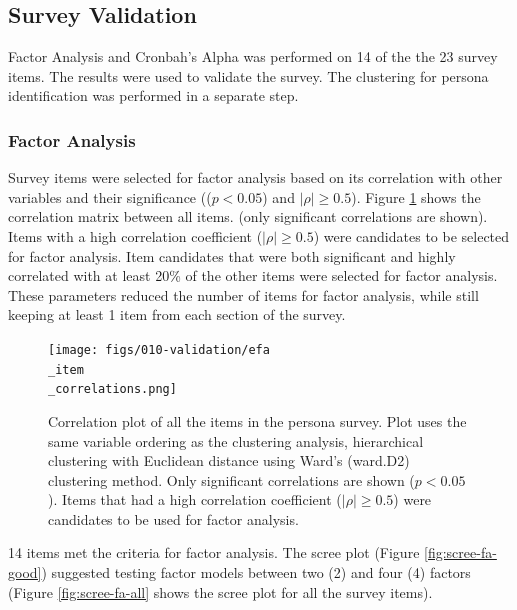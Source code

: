 \documentclass[020-persona\_validation.tex]{subfiles}
\begin{document}
    \subsection{Survey Validation}

        Factor Analysis and Cronbah's Alpha was performed on 14 of the the 23 survey items.
        The results were used to validate the survey.
        The clustering for persona identification was performed in a separate step.

    \subsubsection{Factor Analysis}

        Survey items were selected for factor analysis based on its correlation with other variables and their significance
        (($p < 0.05$) and $\left|\rho\right| \ge 0.5$).
        Figure \ref{fig:persona-item-corr} shows the correlation matrix between all items.
        (only significant correlations are shown).
        Items with a high correlation coefficient ($\left|\rho\right| \ge 0.5$) were candidates to be selected for factor analysis.
        Item candidates that were both significant and highly correlated with at least 20\% of the other items were
        selected for factor analysis.
        These parameters reduced the number of items for factor analysis,
        while still keeping at least 1 item from each section of the survey.

        \begin{figure}[htb]
            \centering
            \texttt{[image: figs/010-validation/efa\\\_item\\\_correlations.png]}
            \caption[Correlation matrix of persona items]
            {Correlation plot of all the items in the persona survey.
             Plot uses the same variable ordering as the clustering analysis,
             hierarchical clustering with Euclidean distance using Ward's (ward.D2) clustering method.
             Only significant correlations are shown ($p < 0.05$).
             Items that had a high correlation coefficient ($\left|\rho\right| \ge 0.5$)
             were candidates to be used for factor analysis.
            }
            \label{fig:persona-item-corr}
        \end{figure}

        14 items met the criteria for factor analysis.
        The scree plot (Figure \ref{fig:scree-fa-good}) suggested testing factor models between two (2) and four (4) factors
        (Figure \ref{fig:scree-fa-all} shows the scree plot for all the survey items).
\end{document}
